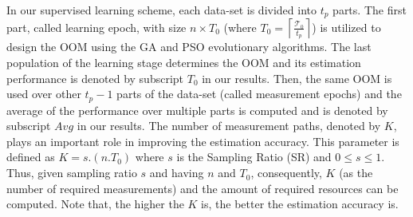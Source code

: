 In our supervised learning scheme, each data-set is divided into $t_{p}$ parts. The first part, called learning epoch, with size $n \times T_{0}$ (where $ T_{0}=\left\lceil \frac{\mathcal{T}_{0}}{t_{p}}\right\rceil$) is utilized to design the OOM using the GA and PSO evolutionary algorithms. The last population of the learning stage determines the OOM and its estimation performance is denoted by subscript $T_{0}$ in our results. Then, the same OOM is used over other $t_{p}-1$ parts of the data-set (called measurement epochs) and the average of the performance over multiple parts is computed and is denoted by subscript $Avg$ in our results. The number of measurement paths, denoted by $K$, plays an important role in improving the estimation accuracy. This parameter is defined as $K=s.(n.T_{0})$ where $s$ is the Sampling Ratio (SR) and $0 \leq s \leq 1$.  Thus, given sampling ratio $s$ and having $n$ and $T_{0}$, consequently, $K$ (as the number of required measurements) and the amount of required resources can be computed. Note that, the higher the $K$ is, the better the estimation accuracy is.


